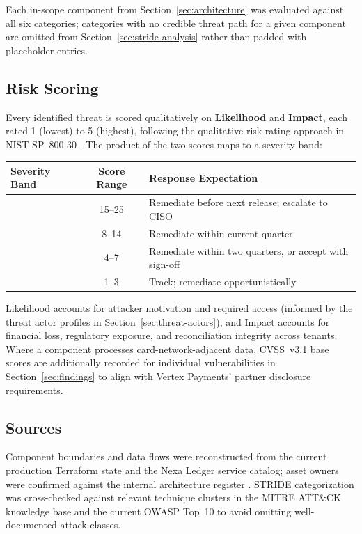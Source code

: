 Each in-scope component from Section~\ref{sec:architecture} was evaluated against all six categories; categories with no credible threat path for a given component are omitted from Section~\ref{sec:stride-analysis} rather than padded with placeholder entries.

\subsection{Risk Scoring}

Every identified threat is scored qualitatively on \textbf{Likelihood} and \textbf{Impact}, each rated 1 (lowest) to 5 (highest), following the qualitative risk-rating approach in NIST SP~800-30 \cite{nist80030}. The product of the two scores maps to a severity band:

\begin{center}
\begin{tabularx}{0.75\linewidth}{@{}l c L@{}}
\toprule
\textbf{Severity Band} & \textbf{Score Range} & \textbf{Response Expectation} \\
\midrule
\critical{} & 15--25 & Remediate before next release; escalate to CISO \\
\highrisk{} & 8--14 & Remediate within current quarter \\
\mediumrisk{} & 4--7 & Remediate within two quarters, or accept with sign-off \\
\lowrisk{} & 1--3 & Track; remediate opportunistically \\
\bottomrule
\end{tabularx}
\end{center}

Likelihood accounts for attacker motivation and required access (informed by the threat actor profiles in Section~\ref{sec:threat-actors}), and Impact accounts for financial loss, regulatory exposure, and reconciliation integrity across tenants. Where a component processes card-network-adjacent data, CVSS~v3.1 base scores \cite{cvss31} are additionally recorded for individual vulnerabilities in Section~\ref{sec:findings} to align with Vertex Payments' partner disclosure requirements.

\subsection{Sources}

Component boundaries and data flows were reconstructed from the current production Terraform state and the Nexa Ledger service catalog; asset owners were confirmed against the internal architecture register \cite{nexa_ledger_arch}. STRIDE categorization was cross-checked against relevant technique clusters in the MITRE ATT\&CK knowledge base \cite{mitre_attack} and the current OWASP Top~10 \cite{owasp_top10} to avoid omitting well-documented attack classes.
